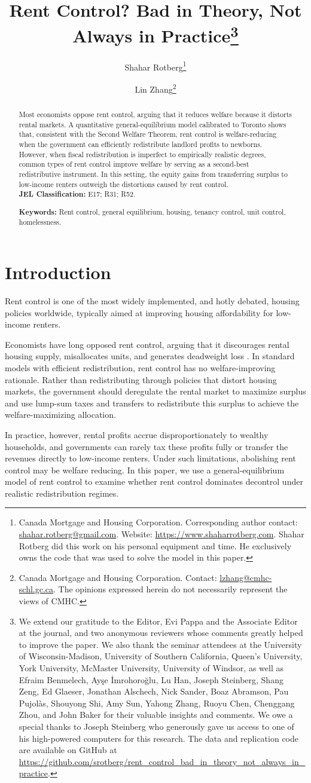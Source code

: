 \documentclass[parskip=full]{article}
\title{\vspace{-1.8cm}Rent Control? Bad in Theory, Not Always in Practice\footnote{We extend our gratitude to the Editor, Evi Pappa and the Associate Editor at the journal, and two anonymous reviewers whose comments greatly helped to improve the paper. We also thank the seminar attendees at the University of Wisconsin-Madison, University of Southern California, Queen's University, York University, McMaster University, University of Windsor, as well as Efraim Benmelech, Ay\c{s}e \.{I}mrohoro\u{g}lu, Lu Han, Joseph Steinberg, Shang Zeng, Ed Glaeser, Jonathan Alschech, Nick Sander, Boaz Abramson, Pau Pujol\`as, Shouyong Shi, Amy Sun, Yahong Zhang, Ruoyu Chen, Chenggang Zhou, and John Baker for their valuable insights and comments. We owe a special thanks to Joseph Steinberg who generously gave us access to one of his high-powered computers for this research. The data and replication code are available on GitHub at \url{https://github.com/srotberg/rent_control_bad_in_theory_not_always_in_practice}.}}
\author{Shahar Rotberg\footnote{Canada Mortgage and Housing Corporation. Corresponding author contact: \url{shahar.rotberg@gmail.com}. Website: \url{https://www.shaharrotberg.com}. Shahar Rotberg did this work on his personal equipment and time. He exclusively owns the code that was used to solve the model in this paper.} \and Lin Zhang\footnote{Canada Mortgage and Housing Corporation. Contact: \url{lzhang@cmhc-schl.gc.ca}. The opinions expressed herein do not necessarily represent the views of CMHC.}}
\begin{document}
\maketitle

\begin{abstract}
\onehalfspacing

\noindent Most economists oppose rent control, arguing that it reduces welfare because it distorts rental markets. A quantitative general-equilibrium model calibrated to Toronto shows that, consistent with the Second Welfare Theorem, rent control is welfare-reducing when the government can efficiently redistribute landlord profits to newborns. However, when fiscal redistribution is imperfect to empirically realistic degrees, common types of rent control improve welfare by serving as a second-best redistributive instrument. In this setting, the equity gains from transferring surplus to low-income renters outweigh the distortions caused by rent control.
\\[1.5ex]

\noindent \textbf{JEL Classification:} E17; R31; R52.

\noindent \textbf{Keywords:} Rent control, general equilibrium, housing, tenancy control, unit control, homelessness.
\end{abstract}

\section{Introduction}

Rent control is one of the most widely implemented, and hotly debated, housing policies worldwide, typically aimed at improving housing affordability for low-income renters.

Economists have long opposed rent control, arguing that it discourages rental housing supply, misallocates units, and generates deadweight loss \citep{gl-2003}. In standard models with efficient redistribution, rent control has no welfare-improving rationale. Rather than redistributing through policies that distort housing markets, the government should deregulate the rental market to maximize surplus and use lump-sum taxes and transfers to redistribute this surplus to achieve the welfare-maximizing allocation.

In practice, however, rental profits accrue disproportionately to wealthy households, and governments can rarely tax these profits fully or transfer the revenues directly to low-income renters. Under such limitations, abolishing rent control may be welfare reducing. In this paper, we use a general-equilibrium model of rent control to examine whether rent control dominates decontrol under realistic redistribution regimes.
\end{document}
